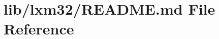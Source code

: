 \hypertarget{lib_2lxm32_2_r_e_a_d_m_e_8md}{}\section{lib/lxm32/\+R\+E\+A\+D\+ME.md File Reference}
\label{lib_2lxm32_2_r_e_a_d_m_e_8md}
